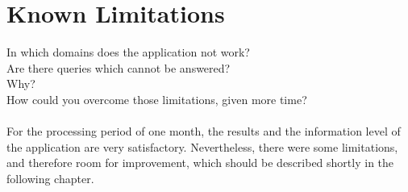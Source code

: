 \section{Known Limitations}
In which domains does the application not work? \\
Are there queries which cannot be answered? \\
Why? \\
How could you overcome those limitations, given more time?
\\ \\

For the processing period of one month, the results and the information level of the application are very satisfactory. Nevertheless, there were some limitations, and therefore room for improvement, which should be described shortly in the following chapter.
\\
